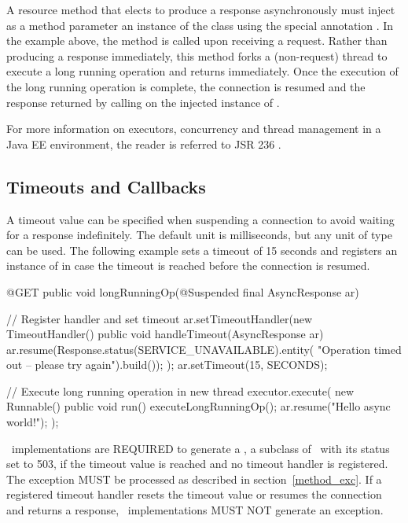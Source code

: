 A resource method that elects to produce a response asynchronously must inject as a method parameter an instance of the class  using the special annotation \Suspended. In the example above, the method  is called upon receiving a  request. Rather than producing a response immediately, this method forks a (non-request) thread to execute a long running operation and returns immediately. Once the execution of the long running operation is complete, the connection is resumed and the response returned by calling  on the injected instance of . 

For more information on executors, concurrency and thread management in a Java EE environment, the reader is referred to JSR 236 \cite{concurrencyee}.

\subsection{Timeouts and Callbacks}
\label{timeouts_and_callbacks}

A timeout value can be specified when suspending a connection to avoid waiting for a response indefinitely. The default unit is milliseconds, but any unit of type  can be used. The following example sets a timeout of 15 seconds and registers an instance of  in case the timeout is reached before the connection is resumed.

\begin{listing}{1}
    @GET
    public void longRunningOp(@Suspended final AsyncResponse ar) {
        // Register handler and set timeout
        ar.setTimeoutHandler(new TimeoutHandler() {
            public void handleTimeout(AsyncResponse ar) {
                ar.resume(Response.status(SERVICE_UNAVAILABLE).entity(
                    "Operation timed out -- please try again").build());                    
                }
        });
        ar.setTimeout(15, SECONDS);
        
        // Execute long running operation in new thread
        executor.execute(
            new Runnable() {
                public void run() {
                    executeLongRunningOp();
                    ar.resume("Hello async world!");
        } });
    }
\end{listing}

\jaxrs\ implementations are REQUIRED to generate a , a subclass of \WebApplicationException\ with its status set to 503, if the timeout value is reached and no timeout handler is registered. The exception MUST be processed as described in section~\ref{method_exc}. If a registered timeout handler resets the timeout value or resumes the connection and returns a response, \jaxrs\ implementations MUST NOT generate an exception.

